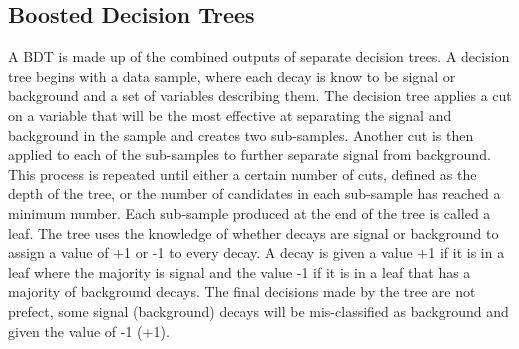 \subsection{Boosted Decision Trees}
\label{sec:GeneralBDT}
A BDT is made up of the combined outputs of separate decision trees. A decision tree begins with a data sample, where each decay is know to be signal or background and a set of variables describing them. The decision tree applies a cut on a variable that will be the most effective at separating the signal and background in the sample and creates two sub-samples. Another cut is then applied to each of the sub-samples to further separate signal from background. This process is repeated until either a certain number of cuts, defined as the depth of the tree, or the number of candidates in each sub-sample has reached a minimum number. Each sub-sample produced at the end of the tree is called a leaf. The tree uses the knowledge of whether decays are signal or background to assign a value of +1 or -1 to every decay. A decay is given a value +1 if it is in a leaf where the majority is signal and the value -1 if it is in a leaf that has a majority of background decays. The final decisions made by the tree are not prefect, some signal (background) decays will be mis-classified as background and given the value of -1 (+1). %

